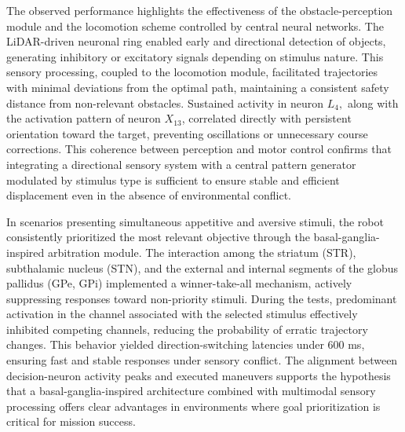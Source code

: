 \documentclass[preprint,12pt]{elsarticle}
\begin{document}
The observed performance highlights the effectiveness of the obstacle-perception module and the locomotion scheme controlled by central neural networks. The LiDAR-driven neuronal ring enabled early and directional detection of objects, generating inhibitory or excitatory signals depending on stimulus nature. This sensory processing, coupled to the locomotion module, facilitated trajectories with minimal deviations from the optimal path, maintaining a consistent safety distance from non-relevant obstacles. Sustained activity in neuron $L_4,$ along with the activation pattern of neuron $X_{13}$, correlated directly with persistent orientation toward the target, preventing oscillations or unnecessary course corrections. This coherence between perception and motor control confirms that integrating a directional sensory system with a central pattern generator modulated by stimulus type is sufficient to ensure stable and efficient displacement even in the absence of environmental conflict. 

In scenarios presenting simultaneous appetitive and aversive stimuli, the robot consistently prioritized the most relevant objective through the basal-ganglia-inspired arbitration module. The interaction among the striatum (STR), subthalamic nucleus (STN), and the external and internal segments of the globus pallidus (GPe, GPi) implemented a winner-take-all mechanism, actively suppressing responses toward non-priority stimuli. During the tests, predominant activation in the channel associated with the selected stimulus effectively inhibited competing channels, reducing the probability of erratic trajectory changes. This behavior yielded direction-switching latencies under 600 ms, ensuring fast and stable responses under sensory conflict. The alignment between decision-neuron activity peaks and executed maneuvers supports the hypothesis that a basal-ganglia-inspired architecture combined with multimodal sensory processing offers clear advantages in environments where goal prioritization is critical for mission success. 
\end{document}
